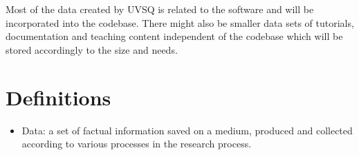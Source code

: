 \documentclass{../../Proposal/LaTeX-proposal/deliverablereport}
\begin{document}
\begin{enumerate}
\begin{itemize}
Most of the data created by UVSQ is related to the software \Sage and will be incorporated into the \Sage codebase. There might also be smaller data sets of tutorials, documentation and teaching content independent of the \Sage codebase which will be stored accordingly to the size and needs.
\end{itemize}
\end{enumerate}

\section{Definitions}

\begin{itemize}
\item{Data:} a set of factual information saved on a medium, produced and collected according to various processes in the research process.
\end{itemize}
\end{document}

